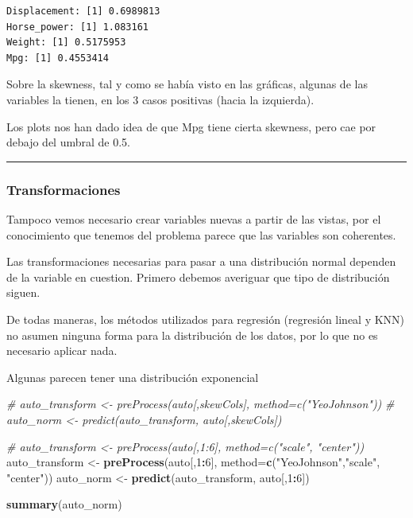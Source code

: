 \documentclass[
]{article}
\newenvironment{Shaded}{\begin{snugshade}}{\end{snugshade}}
\newcommand{\CommentTok}[1]{\textcolor[rgb]{0.56,0.35,0.01}{\textit{#1}}}
\newcommand{\DataTypeTok}[1]{\textcolor[rgb]{0.13,0.29,0.53}{#1}}
\newcommand{\DecValTok}[1]{\textcolor[rgb]{0.00,0.00,0.81}{#1}}
\newcommand{\KeywordTok}[1]{\textcolor[rgb]{0.13,0.29,0.53}{\textbf{#1}}}
\newcommand{\NormalTok}[1]{#1}
\newcommand{\OperatorTok}[1]{\textcolor[rgb]{0.81,0.36,0.00}{\textbf{#1}}}
\newcommand{\StringTok}[1]{\textcolor[rgb]{0.31,0.60,0.02}{#1}}
\begin{document}
\begin{verbatim}
Displacement: [1] 0.6989813
Horse_power: [1] 1.083161
Weight: [1] 0.5175953
Mpg: [1] 0.4553414
\end{verbatim}

Sobre la skewness, tal y como se había visto en las gráficas, algunas de
las variables la tienen, en los 3 casos positivas (hacia la izquierda).

Los plots nos han dado idea de que Mpg tiene cierta skewness, pero cae
por debajo del umbral de 0.5.

\begin{center}\rule{0.5\linewidth}{0.5pt}\end{center}

\hypertarget{transformaciones}{%
\subsubsection{Transformaciones}\label{transformaciones}}

Tampoco vemos necesario crear variables nuevas a partir de las vistas,
por el conocimiento que tenemos del problema parece que las variables
son coherentes.

Las transformaciones necesarias para pasar a una distribución normal
dependen de la variable en cuestion. Primero debemos averiguar que tipo
de distribución siguen.

De todas maneras, los métodos utilizados para regresión (regresión
lineal y KNN) no asumen ninguna forma para la distribución de los datos,
por lo que no es necesario aplicar nada.

Algunas parecen tener una distribución exponencial

\begin{Shaded}
\begin{Highlighting}[]
\CommentTok{# auto_transform <- preProcess(auto[,skewCols], method=c("YeoJohnson"))}
\CommentTok{# auto_norm <- predict(auto_transform, auto[,skewCols])}

\CommentTok{# auto_transform <- preProcess(auto[,1:6], method=c("scale", "center"))}
\NormalTok{auto_transform <-}\StringTok{ }\KeywordTok{preProcess}\NormalTok{(auto[,}\DecValTok{1}\OperatorTok{:}\DecValTok{6}\NormalTok{], }\DataTypeTok{method=}\KeywordTok{c}\NormalTok{(}\StringTok{"YeoJohnson"}\NormalTok{,}\StringTok{"scale"}\NormalTok{, }\StringTok{"center"}\NormalTok{))}
\NormalTok{auto_norm <-}\StringTok{ }\KeywordTok{predict}\NormalTok{(auto_transform, auto[,}\DecValTok{1}\OperatorTok{:}\DecValTok{6}\NormalTok{])}

\KeywordTok{summary}\NormalTok{(auto_norm)}
\end{Highlighting}
\end{Shaded}
\end{document}

